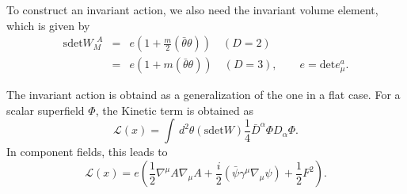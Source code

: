 \documentclass[a4paper,12pt]{article}
\def\bpsi{\bar{\psi}}
\def\btheta{\bar{\theta}}
\begin{document}
To construct an invariant action, we also need the invariant
volume element, which is given by
\begin{eqnarray}
 \mathrm{sdet}W_{M}^{\>\>A}
  &=& e\left(1 + \frac{m}{2}(\btheta\theta)\right) \quad (D=2) \nonumber \\
  &=& e\left(1 + m(\btheta\theta)\right) \quad (D=3),
\qquad e = \mathrm{det}e^{a}_{\mu}.
  \label{ospinvariantvolume}
\end{eqnarray}

The invariant action is obtaind as a
generalization of the one in a flat case. For a scalar superfield $\Phi$,
the Kinetic term is obtained as
\begin{equation}
 \mathcal{L}(x)
  = \int\,d^{2}\theta (\mathrm{sdet}W)
  \frac{1}{4}{\bar D^{\alpha}\Phi} D_{\alpha}\Phi. 
\end{equation}
In component fields, this leads to
\begin{equation}
 \mathcal{L}(x)
  = e\left(\frac{1}{2}\nabla^{\mu}A\nabla_{\mu}A
  + \frac{i}{2}(\bpsi\gamma^{\mu}\nabla_{\mu}\psi)
  + \frac{1}{2}F^{2}\right).
   \label{ospkinelag}
\end{equation}

\vspace{0.3cm}
\vspace{0.3cm}
\end{document}
